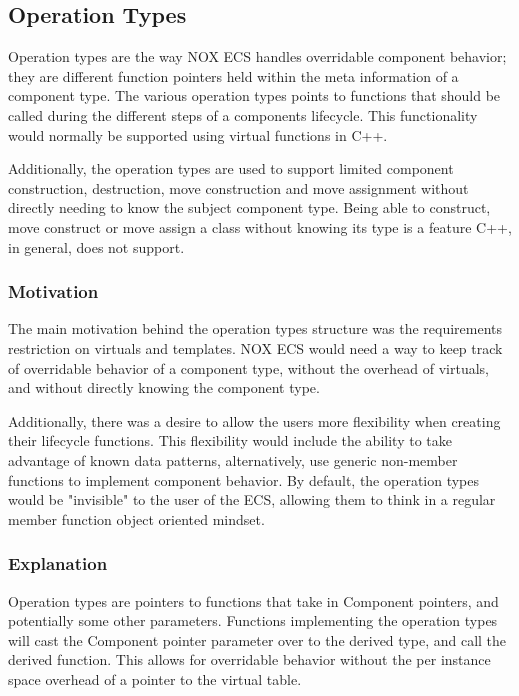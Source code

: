 \subsection{Operation Types}
\label{subsec:detailed_operation_types}
Operation types are the way NOX ECS handles overridable component behavior; they are different function pointers held within the meta information of a component type.
The various operation types points to functions that should be called during the different steps
of a components lifecycle.
This functionality would normally be supported using virtual functions in C++.

Additionally, the operation types are used to support limited component construction, destruction, move construction and move assignment without directly needing to know the subject component type.
Being able to construct, move construct or move assign a class without knowing its type is a feature C++, in general, does not support. 

\subsubsection{Motivation}
The main motivation behind the operation types structure was the requirements restriction on virtuals
and templates.
NOX ECS would need a way to keep track of overridable behavior of a component type, without the overhead of virtuals,
and without directly knowing the component type.

Additionally, there was a desire to allow the users more flexibility when creating their lifecycle functions.
This flexibility would include the ability to take advantage of known data patterns,
alternatively, use generic non-member functions to implement component behavior.
By default, the operation types would be "invisible" to the user of the ECS, allowing them to think in a regular member function object oriented mindset.

\subsubsection{Explanation}
Operation types are pointers to functions that take in Component pointers,
and potentially some other parameters.
Functions implementing the operation types will cast the Component pointer parameter over to the derived type,
and call the derived function.
This allows for overridable behavior without the per instance space overhead of a pointer to the virtual table.

